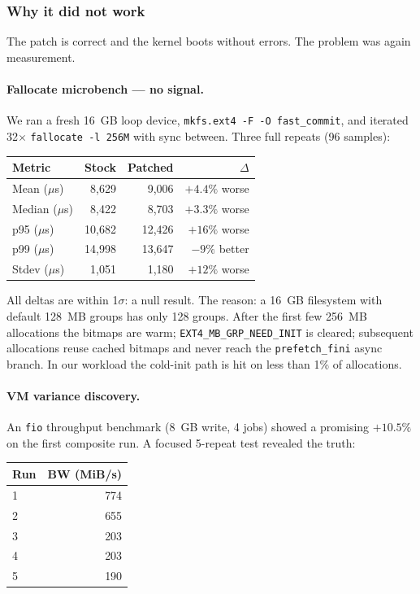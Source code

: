 \documentclass[12pt,a4paper]{article}
\begin{document}
\subsubsection{Why it did not work}

The patch is correct and the kernel boots without errors.  The
problem was again measurement.

\paragraph{Fallocate microbench --- no signal.}
We ran a fresh 16~GB loop device, \texttt{mkfs.ext4 -F -O
fast\_commit}, and iterated 32$\times$ \texttt{fallocate -l 256M}
with sync between.  Three full repeats (96 samples):

\begin{center}
\begin{tabular}{lrrr}
\toprule
Metric & Stock & Patched & $\Delta$ \\
\midrule
Mean ($\mu$s)   & 8{,}629 & 9{,}006 & $+4.4\%$ worse \\
Median ($\mu$s) & 8{,}422 & 8{,}703 & $+3.3\%$ worse \\
p95 ($\mu$s)    & 10{,}682 & 12{,}426 & $+16\%$ worse \\
p99 ($\mu$s)    & 14{,}998 & 13{,}647 & $-9\%$ better \\
Stdev ($\mu$s)  & 1{,}051  & 1{,}180  & $+12\%$ worse \\
\bottomrule
\end{tabular}
\end{center}

All deltas are within 1$\sigma$: a null result.  The reason: a
16~GB filesystem with default 128~MB groups has only 128 groups.
After the first few 256~MB allocations the bitmaps are warm;
\texttt{EXT4\_MB\_GRP\_NEED\_INIT} is cleared; subsequent
allocations reuse cached bitmaps and never reach the
\texttt{prefetch\_fini} async branch.  In our workload the cold-init
path is hit on less than 1\% of allocations.

\paragraph{VM variance discovery.}
An \texttt{fio} throughput benchmark (8~GB write, 4 jobs) showed a
promising $+10.5\%$ on the first composite run.  A focused 5-repeat
test revealed the truth:

\begin{center}
\begin{tabular}{lr}
\toprule
Run & BW (MiB/s) \\
\midrule
1 & 774 \\
2 & 655 \\
3 & 203 \\
4 & 203 \\
5 & 190 \\
\bottomrule
\end{tabular}
\end{center}
\end{document}
